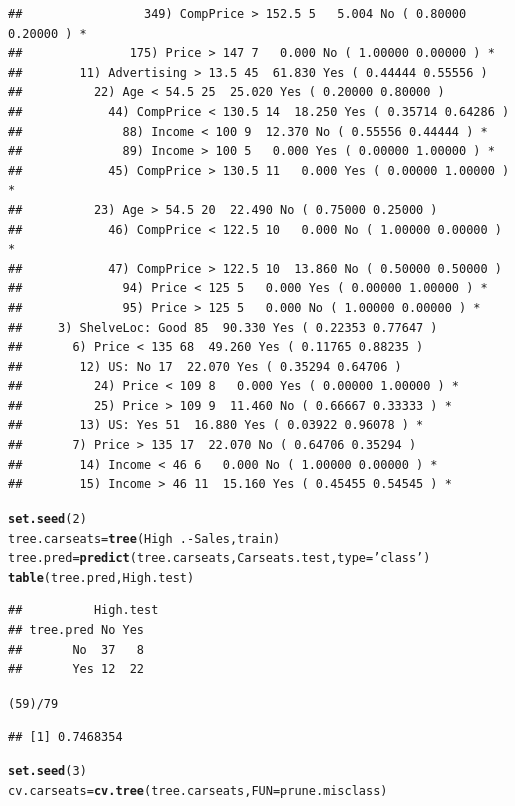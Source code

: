 \documentclass{article}\usepackage[]{graphicx}\usepackage[]{color}
\makeatletter
\newcommand{\hlnum}[1]{\textcolor[rgb]{0.686,0.059,0.569}{#1}}%
\newcommand{\hlstr}[1]{\textcolor[rgb]{0.192,0.494,0.8}{#1}}%
\newcommand{\hlopt}[1]{\textcolor[rgb]{0,0,0}{#1}}%
\newcommand{\hlstd}[1]{\textcolor[rgb]{0.345,0.345,0.345}{#1}}%
\newcommand{\hlkwb}[1]{\textcolor[rgb]{0.69,0.353,0.396}{#1}}%
\newcommand{\hlkwc}[1]{\textcolor[rgb]{0.333,0.667,0.333}{#1}}%
\newcommand{\hlkwd}[1]{\textcolor[rgb]{0.737,0.353,0.396}{\textbf{#1}}}%
\newenvironment{kframe}{%
 \def\at@end@of@kframe{}%
 \ifinner\ifhmode%
  \def\at@end@of@kframe{\end{minipage}}%
  \begin{minipage}{\columnwidth}%
 \fi\fi%
 \def\FrameCommand##1{\hskip\@totalleftmargin \hskip-\fboxsep
 \colorbox{shadecolor}{##1}\hskip-\fboxsep
     \hskip-\linewidth \hskip-\@totalleftmargin \hskip\columnwidth}%
 \MakeFramed {\advance\hsize-\width
   \@totalleftmargin\z@ \linewidth\hsize
   \@setminipage}}%
 {\par\unskip\endMakeFramed%
 \at@end@of@kframe}
\newenvironment{knitrout}{}{} %
\makeatother
\begin{document}
\begin{enumerate}[(a)]
\begin{knitrout}
\begin{kframe}
\begin{verbatim}
##                 349) CompPrice > 152.5 5   5.004 No ( 0.80000 0.20000 ) *
##               175) Price > 147 7   0.000 No ( 1.00000 0.00000 ) *
##        11) Advertising > 13.5 45  61.830 Yes ( 0.44444 0.55556 )  
##          22) Age < 54.5 25  25.020 Yes ( 0.20000 0.80000 )  
##            44) CompPrice < 130.5 14  18.250 Yes ( 0.35714 0.64286 )  
##              88) Income < 100 9  12.370 No ( 0.55556 0.44444 ) *
##              89) Income > 100 5   0.000 Yes ( 0.00000 1.00000 ) *
##            45) CompPrice > 130.5 11   0.000 Yes ( 0.00000 1.00000 ) *
##          23) Age > 54.5 20  22.490 No ( 0.75000 0.25000 )  
##            46) CompPrice < 122.5 10   0.000 No ( 1.00000 0.00000 ) *
##            47) CompPrice > 122.5 10  13.860 No ( 0.50000 0.50000 )  
##              94) Price < 125 5   0.000 Yes ( 0.00000 1.00000 ) *
##              95) Price > 125 5   0.000 No ( 1.00000 0.00000 ) *
##     3) ShelveLoc: Good 85  90.330 Yes ( 0.22353 0.77647 )  
##       6) Price < 135 68  49.260 Yes ( 0.11765 0.88235 )  
##        12) US: No 17  22.070 Yes ( 0.35294 0.64706 )  
##          24) Price < 109 8   0.000 Yes ( 0.00000 1.00000 ) *
##          25) Price > 109 9  11.460 No ( 0.66667 0.33333 ) *
##        13) US: Yes 51  16.880 Yes ( 0.03922 0.96078 ) *
##       7) Price > 135 17  22.070 No ( 0.64706 0.35294 )  
##        14) Income < 46 6   0.000 No ( 1.00000 0.00000 ) *
##        15) Income > 46 11  15.160 Yes ( 0.45455 0.54545 ) *
\end{verbatim}
\begin{alltt}
\hlkwd{set.seed} \hlstd{(}\hlnum{2}\hlstd{)}
\hlstd{tree.carseats} \hlkwb{=}\hlkwd{tree}\hlstd{(High}\hlopt{~}\hlstd{.}\hlopt{-}\hlstd{Sales, train)}
\hlstd{tree.pred}\hlkwb{=}\hlkwd{predict}\hlstd{(tree.carseats, Carseats.test,} \hlkwc{type} \hlstd{=} \hlstr{'class'} \hlstd{)}
\hlkwd{table}\hlstd{(tree.pred, High.test)}
\end{alltt}
\begin{verbatim}
##          High.test
## tree.pred No Yes
##       No  37   8
##       Yes 12  22
\end{verbatim}
\begin{alltt}
\hlstd{(}\hlnum{59}\hlstd{)}\hlopt{/}\hlnum{79}
\end{alltt}
\begin{verbatim}
## [1] 0.7468354
\end{verbatim}
\begin{alltt}
\hlkwd{set.seed} \hlstd{(}\hlnum{3}\hlstd{)}
\hlstd{cv.carseats} \hlkwb{=}\hlkwd{cv.tree}\hlstd{(tree.carseats ,}\hlkwc{FUN}\hlstd{=prune.misclass )}

\end{alltt}
\end{kframe}
\end{knitrout}
\end{enumerate}
\end{document}
